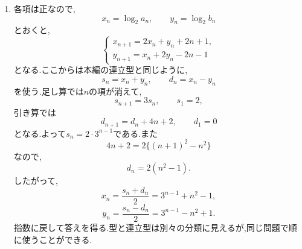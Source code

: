 \begin{enumerate}[label=\textbf{問\arabic*.},leftmargin=3.8em,format=\bookitemlink{practice-advanced}{solution}{problem}]
                \noindent \textbf{【別解】}\\
                の式に両辺の係数を掛ける形のまま,
                \[
                 (n+2)(n+4)d_{n+1}
                   =(n+1)(n+3)d_n
                \]
                を眺めると,\, $e_n=(n+1)(n+3)d_n$が定数である.初項$e_1=8$から直ちに$\displaystyle d_n=\frac{8}{(n+1)(n+3)}$を得る.相殺する積を全部書く代わりに,相殺後に残る因子をへ組み込める.
          \item 各項は正なので,
                \[
                  x_n=\log_2a_n,\qquad y_n=\log_2b_n
                \]
                とおくと,
                \[
                 \begin{cases}
                  x_{n+1}=2x_n+y_n+2n+1,\\
                  y_{n+1}=x_n+2y_n-2n-1
                 \end{cases}
                \]
                となる.ここからは本編の連立型と同じように,
                \[
                  s_n=x_n+y_n,\qquad d_n=x_n-y_n
                \]
                を使う.足し算では$n$の項が消えて,
                \[
                  s_{n+1}=3s_n,\qquad s_1=2,
                \]
                引き算では
                \[
                  d_{n+1}=d_n+4n+2,\qquad d_1=0
                \]
                となる.よって$s_n=2\cdot3^{n-1}$である.また
                \[
                 4n+2=2\{(n+1)^2-n^2\}
                \]
                なので,
                \[
                 d_n=2(n^2-1).
                \]
                したがって,
                \[
                 x_n=\frac{s_n+d_n}{2}=3^{n-1}+n^2-1,
                \]
                \[
                 y_n=\frac{s_n-d_n}{2}=3^{n-1}-n^2+1.
                \]
                指数に戻して答えを得る.型と連立型は別々の分類に見えるが,同じ問題で順に使うことができる.


\end{enumerate}
